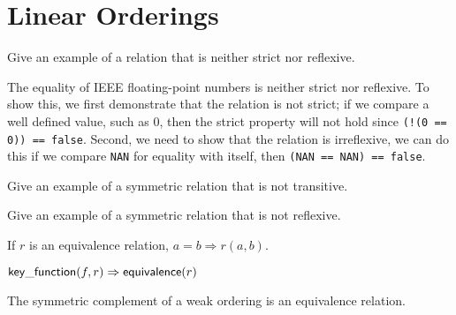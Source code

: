 \chapter{Linear Orderings}

\begin{exercise}
	Give an example of a relation that is neither strict nor reflexive.
\end{exercise}

\begin{solution}
	The equality of IEEE floating-point numbers is neither strict nor reflexive. To show this, we first
	demonstrate that the relation is not strict; if we compare a well defined value, such as 0, then
	the strict property will not hold since \verb|(!(0 == 0)) == false|. Second, we need to show that
	the relation is irreflexive, we can do this if we compare \verb|NAN| for equality with itself, then
	\verb|(NAN == NAN) == false|.

	
\end{solution}

\begin{exercise}
	Give an example of a symmetric relation that is not transitive.
\end{exercise}

\begin{exercise}
	Give an example of a symmetric relation that is not reflexive.
\end{exercise}

\begin{lemma}
	If $r$ is an equivalence relation, $a = b \Rightarrow r(a, b)$.
\end{lemma}

\begin{lemma}
	$\mathsf{key\_function}(f, r) \Rightarrow \mathsf{equivalence}(r)$
\end{lemma}

\begin{lemma}
	The symmetric complement of a weak ordering is an equivalence relation.
\end{lemma}
